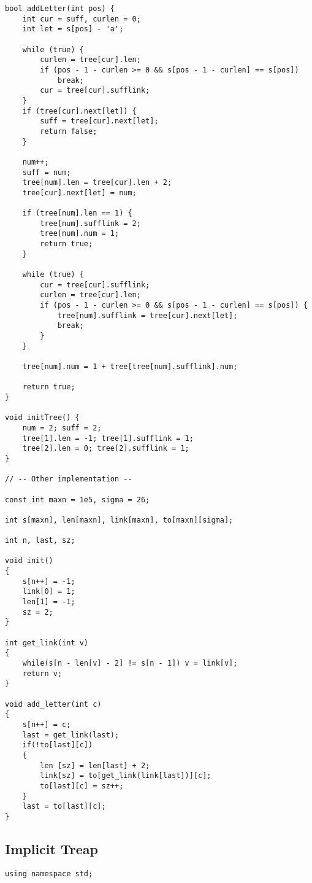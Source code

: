 \documentclass[10pt]{article}
\begin{document}
\begin{multicols*}{2}
\begin{lstlisting}[style=compactcpp]
bool addLetter(int pos) {
    int cur = suff, curlen = 0;
    int let = s[pos] - 'a';

    while (true) {
        curlen = tree[cur].len;
        if (pos - 1 - curlen >= 0 && s[pos - 1 - curlen] == s[pos])     
            break;  
        cur = tree[cur].sufflink;
    }       
    if (tree[cur].next[let]) {  
        suff = tree[cur].next[let];
        return false;
    }

    num++;
    suff = num;
    tree[num].len = tree[cur].len + 2;
    tree[cur].next[let] = num;

    if (tree[num].len == 1) {
        tree[num].sufflink = 2;
        tree[num].num = 1;
        return true;
    }

    while (true) {
        cur = tree[cur].sufflink;
        curlen = tree[cur].len;
        if (pos - 1 - curlen >= 0 && s[pos - 1 - curlen] == s[pos]) {
            tree[num].sufflink = tree[cur].next[let];
            break;
        }       
    }           

    tree[num].num = 1 + tree[tree[num].sufflink].num;

    return true;
}

void initTree() {
    num = 2; suff = 2;
    tree[1].len = -1; tree[1].sufflink = 1;
    tree[2].len = 0; tree[2].sufflink = 1;
}

// -- Other implementation --

const int maxn = 1e5, sigma = 26;
 
int s[maxn], len[maxn], link[maxn], to[maxn][sigma];
 
int n, last, sz;
 
void init()
{
    s[n++] = -1;
    link[0] = 1;
    len[1] = -1;
    sz = 2;
}
 
int get_link(int v)
{
    while(s[n - len[v] - 2] != s[n - 1]) v = link[v];
    return v;
}
 
void add_letter(int c)
{
    s[n++] = c;
    last = get_link(last);
    if(!to[last][c])
    {
        len [sz] = len[last] + 2;
        link[sz] = to[get_link(link[last])][c];
        to[last][c] = sz++;
    }
    last = to[last][c];
}
\end{lstlisting}

\subsection{Implicit Treap}

\begin{lstlisting}[style=compactcpp]
using namespace std;


\end{lstlisting}
\end{multicols*}
\end{document}
